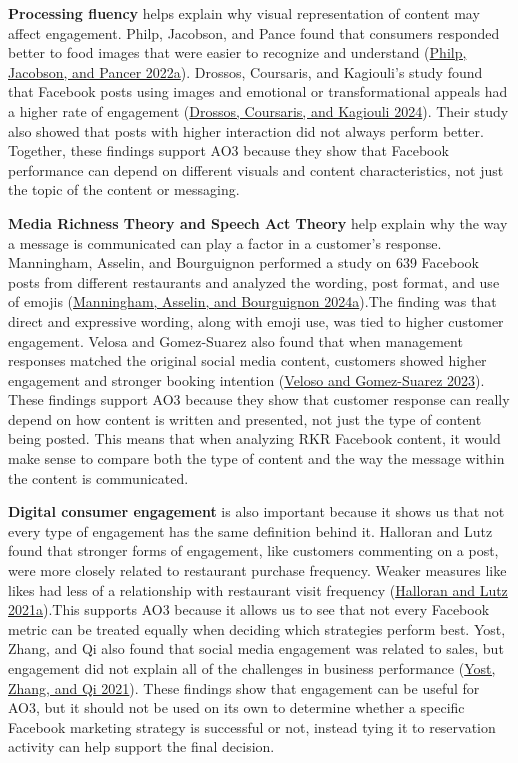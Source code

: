 \documentclass[
  12pt,
  letterpaper,
  DIV=11,
  numbers=noendperiod]{scrartcl}
\begin{document}
\textbf{Processing fluency} helps explain why visual representation of
content may affect engagement. Philp, Jacobson, and Pance found that
consumers responded better to food images that were easier to recognize
and understand (\hyperref[ref-philp2022b]{Philp, Jacobson, and Pancer
2022a}). Drossos, Coursaris, and Kagiouli's study found that Facebook
posts using images and emotional or transformational appeals had a
higher rate of engagement (\hyperref[ref-drossos2024]{Drossos,
Coursaris, and Kagiouli 2024}). Their study also showed that posts with
higher interaction did not always perform better. Together, these
findings support AO3 because they show that Facebook performance can
depend on different visuals and content characteristics, not just the
topic of the content or messaging.~

\textbf{Media Richness Theory and Speech Act Theory} help explain why
the way a message is communicated can play a factor in a customer's
response. Manningham, Asselin, and Bourguignon performed a study on 639
Facebook posts from different restaurants and analyzed the wording, post
format, and use of emojis (\hyperref[ref-manningham2024]{Manningham,
Asselin, and Bourguignon 2024a}).The finding was that direct and
expressive wording, along with emoji use, was tied to higher customer
engagement. Velosa and Gomez-Suarez also found that when management
responses matched the original social media content, customers showed
higher engagement and stronger booking intention
(\hyperref[ref-veloso2023]{Veloso and Gomez-Suarez 2023}). These
findings support AO3 because they show that customer response can really
depend on how content is written and presented, not just the type of
content being posted. This means that when analyzing RKR Facebook
content, it would make sense to compare both the type of content and the
way the message within the content is communicated.

\textbf{Digital consumer engagement} is also important because it shows
us that not every type of engagement has the same definition behind it.
Halloran and Lutz found that stronger forms of engagement, like
customers commenting on a post, were more closely related to restaurant
purchase frequency. Weaker measures like likes had less of a
relationship with restaurant visit frequency
(\hyperref[ref-halloran2021]{Halloran and Lutz 2021a}).This supports AO3
because it allows us to see that not every Facebook metric can be
treated equally when deciding which strategies perform best. Yost,
Zhang, and Qi also found that social media engagement was related to
sales, but engagement did not explain all of the challenges in business
performance (\hyperref[ref-yost2021]{Yost, Zhang, and Qi 2021}). These
findings show that engagement can be useful for AO3, but it should not
be used on its own to determine whether a specific Facebook marketing
strategy is successful or not, instead tying it to reservation activity
can help support the final decision.~
\end{document}
